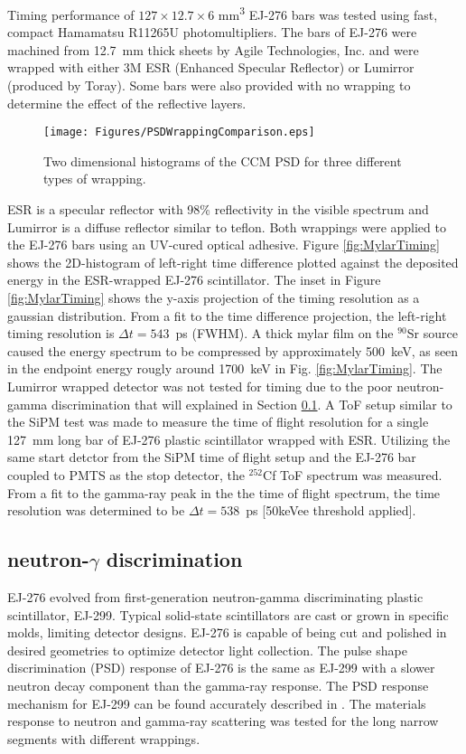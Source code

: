 Timing performance of $127\times12.7\times6$ mm\textsuperscript{3} EJ-276 bars was tested using fast, compact Hamamatsu R11265U photomultipliers. The bars of EJ-276 were machined from 12.7~mm thick sheets by Agile Technologies, Inc. and were wrapped with either 3M\textsuperscript{\texttrademark} ESR (Enhanced Specular Reflector) or Lumirror\textsuperscript{\texttrademark} (produced by Toray). Some bars were also provided with no wrapping to determine the effect of the reflective layers.
\begin{figure*}[tbp]
 \centering
  \texttt{[image: Figures/PSDWrappingComparison.eps]}
  \caption{Two dimensional histograms of the CCM PSD for three different types of wrapping.}
  \label{fig:PSDEJ276}
\end{figure*}
ESR is a specular reflector with 98\% reflectivity in the visible spectrum and Lumirror\textsuperscript{\texttrademark} is a diffuse reflector similar to teflon. Both wrappings were applied to the EJ-276 bars using an UV-cured optical adhesive. Figure \ref{fig:MylarTiming} shows the 2D-histogram of left-right time difference plotted against the deposited energy in the ESR-wrapped EJ-276 scintillator. The inset in Figure \ref{fig:MylarTiming} shows the y-axis projection of the timing resolution as a gaussian distribution. From a fit to the time difference projection, the left-right timing resolution is $\Delta t=543$~ps (FWHM). A thick mylar film on the $^{90}$Sr source caused the energy spectrum to be compressed by approximately 500~keV, as seen in the endpoint energy rougly around 1700~keV in Fig. \ref{fig:MylarTiming}.  The Lumirror\textsuperscript{\texttrademark} wrapped detector was not tested for timing due to the poor neutron-gamma discrimination that will explained in Section \ref{sec:PSD}.
A ToF setup similar to the SiPM test was made to measure the time of flight resolution for a single 127~mm long bar of EJ-276 plastic scintillator wrapped with ESR. Utilizing the same start detctor from the SiPM time of flight setup and the EJ-276 bar coupled to PMTS as the stop detector, the $^{252}$Cf ToF spectrum was measured. From a fit to the gamma-ray peak in the the time of flight spectrum, the time resolution was determined to be $\Delta t=538$~ps [50keVee threshold applied].

\subsection{neutron-${\mathit \gamma}$ discrimination} \label{sec:PSD}
EJ-276 evolved from first-generation neutron-gamma discriminating plastic scintillator, EJ-299. Typical solid-state scintillators are cast or grown in specific molds, limiting detector designs. EJ-276 is capable of being cut and polished in desired geometries to optimize detector light collection. The pulse shape discrimination (PSD) response of EJ-276 is the same as EJ-299 with a slower neutron decay component than the gamma-ray response. The PSD response mechanism for EJ-299 can be found accurately described in \cite{Zaitseva2012}. The materials response to neutron and gamma-ray scattering was tested for the long narrow segments with different wrappings.

